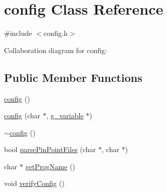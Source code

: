 \hypertarget{classconfig}{
\section{config Class Reference}
\label{classconfig}
}


{\ttfamily \#include $<$config.h$>$}



Collaboration diagram for config:
\subsection*{Public Member Functions}
\begin{DoxyCompactItemize}
\item 
\hyperlink{classconfig_ab1b245308f26ce7979e4c37e93869706}{config} ()
\item 
\hyperlink{classconfig_a83e543efde26a3bd118757ddf1fa098f}{config} (char $\ast$, \hyperlink{structg__variable}{g\_\-variable} $\ast$)
\item 
\hyperlink{classconfig_a9b8b1ccf97780676a19296f72fee3aae}{$\sim$config} ()
\item 
bool \hyperlink{classconfig_ac94cb602566243ecb9f76d05cb3199fa}{parsePinPointFiles} (char $\ast$, char $\ast$)
\item 
char $\ast$ \hyperlink{classconfig_a9530da432f14dc0e96f794e13475e4be}{getProgName} ()
\item 
void \hyperlink{classconfig_a130fd7b4a660ecb2a3522221427f5956}{verifyConfig} ()
\end{DoxyCompactItemize}
